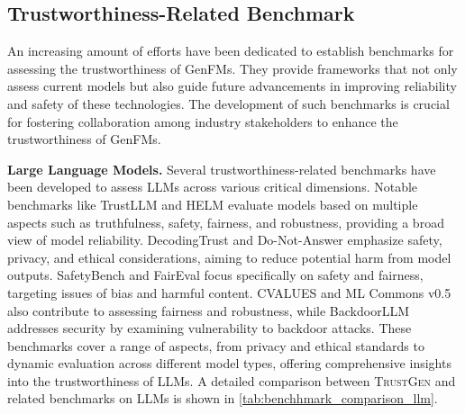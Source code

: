 \subsection{Trustworthiness-Related Benchmark}
\label{sec:benchmark_related_work}
An increasing amount of efforts have been dedicated to establish %
benchmarks for assessing the trustworthiness of GenFMs. They provide frameworks that not only assess current models but also guide future advancements in improving reliability and safety of these technologies. The development of such benchmarks is crucial for fostering collaboration among industry stakeholders to enhance the trustworthiness of GenFMs. 

\textbf{Large Language Models.} Several trustworthiness-related benchmarks have been developed to assess LLMs across various critical dimensions. Notable benchmarks like TrustLLM \cite{huang2024position} and HELM \cite{liang2022holistic} evaluate models based on multiple aspects such as truthfulness, safety, fairness, and robustness, providing a broad view of model reliability. DecodingTrust \cite{wang2023decodingtrust} and Do-Not-Answer \cite{wang2023donotanswer} emphasize safety, privacy, and ethical considerations, aiming to reduce potential harm from model outputs. SafetyBench \cite{sun2023safety} and FairEval \cite{wang2023large} focus specifically on safety and fairness, targeting issues of bias and harmful content. CVALUES \cite{xu2023cvalues} and ML Commons v0.5 \cite{vidgen2024introducing} also contribute to assessing fairness and robustness, while BackdoorLLM \cite{li2024backdoorllm} addresses security by examining vulnerability to backdoor attacks. These benchmarks cover a range of aspects, from privacy and ethical standards to dynamic evaluation across different model types, offering comprehensive insights into the trustworthiness of LLMs. A detailed comparison between \textsc{TrustGen} and related benchmarks on LLMs  is shown in \autoref{tab:benchhmark_comparison_llm}. 

